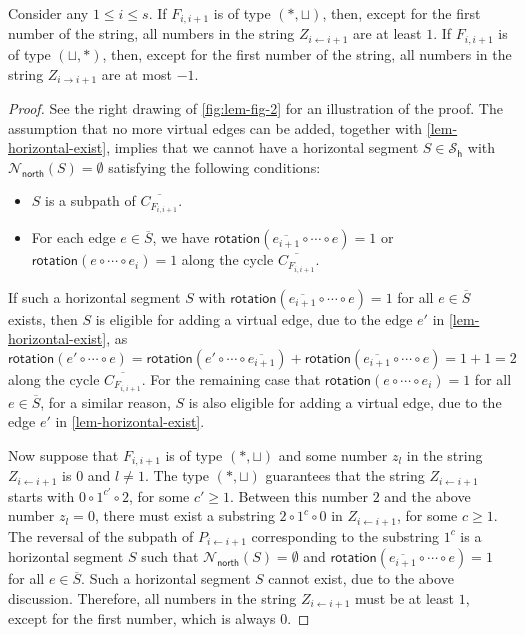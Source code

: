 \documentclass{article}\usepackage[a4paper,margin=20mm]{geometry}
\newcommand{\PH}{\mathcal{S}_\mathsf{h}}
\newcommand{\Nnorth}{\mathcal{N}_\mathsf{north}}
\newcommand{\rotation}{\mathsf{rotation}}
\begin{document}
\begin{lemma}\label{lem-rotation-calculation}
Consider any $1 \leq i \leq s$.
If $F_{i,i+1}$ is of type $(\ast, \sqcup)$, then, except for the first number of the string, all numbers in the string  $Z_{i \leftarrow i+1}$ are at least $1$.
If $F_{i,i+1}$ is of type $(\sqcup,\ast)$, then, except for the first number of the string, all numbers in the string  $Z_{i \rightarrow i+1}$ are at most $-1$.
\end{lemma}
\begin{proof}
See the right drawing of \cref{fig:lem-fig-2} for an illustration of the proof.
  The assumption that no more virtual edges can be added, 
 together with \cref{lem-horizontal-exist}, implies that we cannot have a horizontal segment $S \in \PH$ 
 with $\Nnorth(S)=\emptyset$ satisfying the following conditions:
 \begin{itemize}
     \item $S$ is a subpath of $\overline{C_{F_{i,i+1}}}$.
     \item For each edge $e \in \overline{S}$, we have $\rotation(\overline{e_{i+1}} \circ \cdots \circ e)=1$  or $\rotation(e \circ \cdots \circ {e_{i}})=1$ along the cycle $\overline{C_{F_{i,i+1}}}$.
 \end{itemize}
 If such a horizontal segment $S$ with 
$\rotation(\overline{e_{i+1}} \circ \cdots \circ e)=1$ for all $e \in \overline{S}$ exists, then $S$ is eligible for adding a virtual edge, due to the edge $e'$ in  \cref{lem-horizontal-exist}, as
\[\rotation(e' \circ \cdots \circ e) 
= \rotation(e' \circ \cdots \circ \overline{e_{i+1}}) + \rotation(\overline{e_{i+1}} \circ \cdots \circ e)
=1+1=2
\]
along the cycle  $\overline{C_{F_{i,i+1}}}$. 
For the remaining case that 
$\rotation(e \circ \cdots \circ {e_{i}})=1$ for all $e \in \overline{S}$,  for a similar reason, $S$ is also eligible for adding a virtual edge, due to the edge $e'$ in  \cref{lem-horizontal-exist}. 


 
  
  Now suppose that $F_{i,i+1}$ is of type $(\ast, \sqcup)$ and some number $z_l$ in the string  $Z_{i \leftarrow i+1}$ is $0$ and $l \neq 1$. The type $(\ast, \sqcup)$ guarantees that the string $Z_{i \leftarrow i+1}$ starts with $0 \circ 1^{c'} \circ 2$, for some $c' \geq 1$. Between this number $2$ and the above number $z_l=0$,  there must exist a substring $2 \circ 1^c \circ 0$ in $Z_{i \leftarrow i+1}$, for some $c \geq 1$. The reversal of the subpath of $P_{i \leftarrow i+1}$ corresponding to the substring $1^c$ is a horizontal segment  $S$ such that $\Nnorth(S)=\emptyset$ and $\rotation(\overline{e_{i+1}} \circ \cdots \circ e)=1$ for all $e \in \overline{S}$. Such a horizontal segment  $S$  cannot exist, due to the above discussion. Therefore,  all numbers in the string  $Z_{i \leftarrow i+1}$ must be at least $1$, except for the first number, which is always $0$.  
  

\end{proof}
\end{document}
